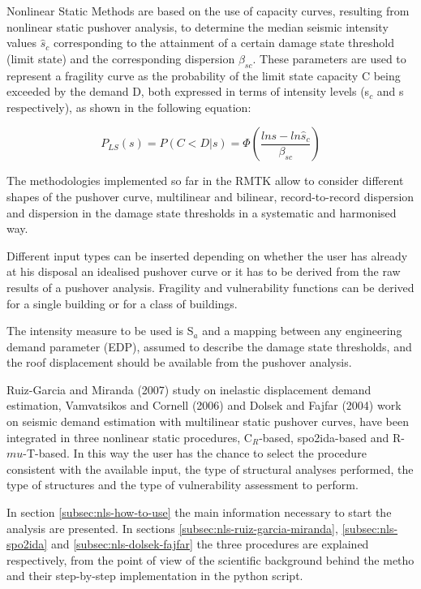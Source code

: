 Nonlinear Static Methods are based on the use of capacity curves, resulting from nonlinear static pushover analysis, to determine the median seismic intensity values $\hat{s}_c$ corresponding to the attainment of a certain damage state threshold (limit state) and the corresponding dispersion $\beta_{sc}$. These parameters are used to represent a fragility curve as the probability of the limit state capacity C being exceeded by the demand D, both expressed in terms of intensity levels (s$_c$ and s respectively), as shown in the following equation:

\begin{equation}
P_{LS}(s) = P(C < D | s) = \Phi(\frac{ln s -ln \hat{s}_c}{\beta_{sc}})
\label{eq:fragility-definition}
\end{equation}

The methodologies implemented so far in the RMTK allow to consider different shapes of the pushover curve, multilinear and bilinear, record-to-record dispersion and dispersion in the damage state thresholds in a systematic and harmonised way. 

Different input types can be inserted depending on whether the user has already at his disposal an idealised pushover curve or it has to be derived from the raw results of a pushover analysis. Fragility and vulnerability functions can be derived for a single building or for a class of buildings.

The intensity measure to be used is S$_a$ and a mapping between any engineering demand parameter (EDP), assumed to describe the damage state thresholds, and the roof displacement should be available from the pushover analysis.

Ruiz-Garcia and Miranda (2007) study on inelastic displacement demand estimation, Vamvatsikos and Cornell (2006) and Dolsek and Fajfar (2004) work on seismic demand estimation with multilinear static pushover curves, have been integrated in three nonlinear static procedures, C$_R$-based, spo2ida-based and R-$mu$-T-based. In this way the user has the chance to select the procedure consistent with the available input, the type of structural analyses performed, the type of structures and the type of vulnerability assessment to perform. 

In section \ref{subsec:nls-how-to-use} the main information necessary to start the analysis are presented. In sections \ref{subsec:nls-ruiz-garcia-miranda}, \ref{subsec:nls-spo2ida} and \ref{subsec:nls-dolsek-fajfar} the three procedures are explained respectively, from the point of view of the scientific background behind the metho and their step-by-step implementation in the python script.
